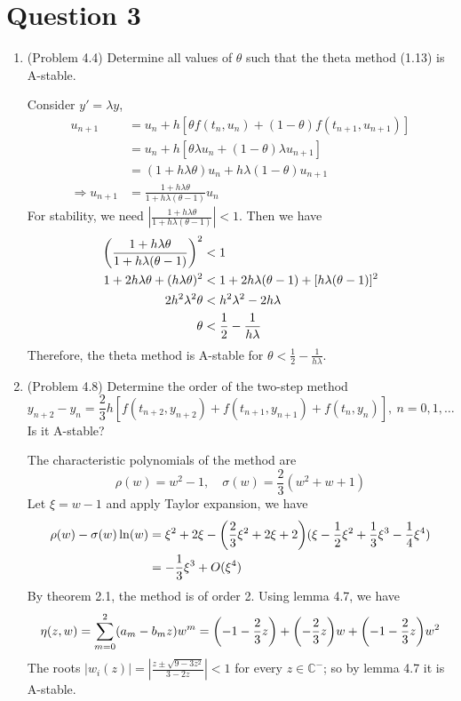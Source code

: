 \documentclass[10pt]{report}
\newcommand{\ds}{\displaystyle}
\newcommand{\abs}[1] {\left| #1 \right|}
\DeclarePairedDelimiter\autoparen{(}{)}
\newcommand{\pa}[1]{\autoparen*{#1}}
\begin{document}
\section*{Question 3}
\begin{enumerate}
	\item 
	(Problem 4.4) Determine all values of $\theta$ such that the theta method (1.13) is A-stable.
	
	Consider $y'=\lambda y$,
	\begin{align*}
		u_{n+1} &= u_n + h[\theta f(t_n, u_n) + (1-\theta)f(t_{n+1}, u_{n+1})]\\
		&= u_n + h[\theta\lambda u_n + (1-\theta)\lambda u_{n+1}]\\
		&= (1+h\lambda\theta) u_n + h\lambda(1-\theta) u_{n+1}\\
		\Rightarrow
		u_{n+1} &= \frac{1+h\lambda\theta}{1+h\lambda(\theta-1)} u_n
	\end{align*}
	For stability, we need $\abs{\frac{1+h\lambda\theta}{1+h\lambda(\theta-1)}}<1$. Then we have
	\begin{align*}
		\pa{\frac{1+h\lambda\theta}{1+h\lambda(\theta-1)}}^2 &< 1\\
		1+2h\lambda\theta + (h\lambda\theta)^2 &< 1+2h\lambda(\theta-1) + [h\lambda(\theta-1)]^2\\
		2h^2\lambda^2\theta &< h^2\lambda^2 - 2h\lambda\\
		\theta &< \frac{1}{2} - \frac{1}{h\lambda}
	\end{align*}
	Therefore, the theta method is A-stable for $\theta < \frac{1}{2} - \frac{1}{h\lambda}$.
	
	\item 
	(Problem 4.8) Determine the order of the two-step method
	\[
	y_{n+2} - y_n = \frac{2}{3}h[f(t_{n+2},y_{n+2}) + f(t_{n+1},y_{n+1}) + f(t_{n},y_{n})],\ n=0,1,\dots
	\]
	Is it A-stable?
	
	The characteristic polynomials of the method are
	\[
	\rho(w) = w^2 - 1, \quad \sigma(w) = \frac{2}{3}(w^2 + w + 1)
	\]
	Let $\xi = w-1$ and apply Taylor expansion, we have
	\begin{align*}
		\rho(w) - \sigma(w)\ln(w)
		&= \xi^2 + 2\xi - \pa{\frac{2}{3}\xi^2 + 2\xi + 2}(\xi - \frac{1}{2}\xi^2 + \frac{1}{3}\xi^3 - \frac{1}{4}\xi^4)\\
		&= -\frac{1}{3}\xi^3 + O(\xi^4)
	\end{align*}
	By theorem 2.1, the method is of order 2. Using lemma 4.7, we have
	\[
	\eta(z, w) = \sum_{m=0}^{2} (a_m - b_mz)w^m = \pa{-1-\frac{2}{3}z} + \pa{-\frac{2}{3}z}w + \pa{-1-\frac{2}{3}z}w^2
	\]
	The roots $\ds \abs{w_i(z)} = \abs{\frac{z\pm \sqrt{9-3z^2}}{3-2z}} < 1$ for every $z\in \mathbb{C}^-$; so by lemma 4.7 it is A-stable.
\end{enumerate}
\end{document}
